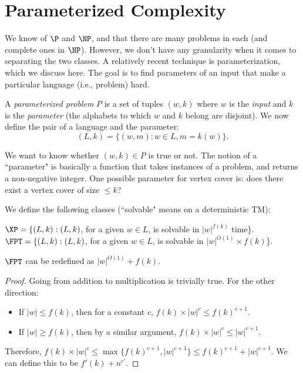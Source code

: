 \section{Parameterized Complexity}

We know of $\P$ and $\NP$, and that there are many problems in each (and complete ones in $\NP$). However, we don't have any granularity when it comes to separating the two classes. A relatively recent technique is parameterization, which we discuss here. The goal is to find parameters of an input that make a particular language (i.e., problem) hard. 

\begin{definition}
A \emph{parameterized problem} $P$ is a set of tuples $(w, k)$ where $w$ is the \emph{input} and $k$ is the \emph{parameter} (the alphabets to which $w$ and $k$ belong are disjoint). We now define the pair of a language and the parameter:
\[
(L, k) = \{(w, m) : w \in L, m = k(w)\}.
\]
\end{definition}

We want to know whether $(w, k) \in P$ is true or not. The notion of a ``parameter" is basically a function that takes instances of a problem, and returns a non-negative integer. One possible parameter for vertex cover is: does there exist a vertex cover of size $\le k$?

\begin{definition}
We define the following classes (``solvable" means on a deterministic TM):
\begin{center}
$\XP = \{(L, k) : (L, k)$, for a given $w \in L$, is solvable in $|w|^{f(k)}$ time\}.\\
$\FPT = \{(L, k) : (L, k)$, for a given $w \in L$, is solvable in $|w|^{O(1)} \times f(k)$\}.
\end{center}
\end{definition}

\begin{theorem}
$\FPT$ can be redefined as $|w|^{O(1)} + f(k)$.
\end{theorem}

\begin{proof}
Going from addition to multiplication is trivially true. For the other direction:
\begin{itemize}
\item If $|w| \le f(k)$, then for a constant $c$, $f(k) \times |w|^c \le f(k)^{c+1}$.
\item If $|w| \ge f(k)$, then by a similar argument, $f(k) \times |w|^c \le |w|^{c+1}$.
\end{itemize}
Therefore, $f(k) \times |w|^c \le \max\{f(k)^{c+1}, |w|^{c+1}\} \le f(k)^{c+1} + |w|^{c+1}$. We can define this to be $f'(k) + n^{c'}$.
\end{proof}

